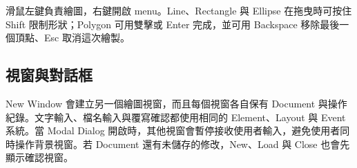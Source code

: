 滑鼠左鍵負責繪圖，右鍵開啟 menu。Line、Rectangle 與 Ellipse 在拖曳時可按住 Shift 限制形狀；Polygon 可用雙擊或 Enter 完成，並可用 Backspace 移除最後一個頂點、Esc 取消這次繪製。

\subsection{視窗與對話框}

New Window 會建立另一個繪圖視窗，而且每個視窗各自保有 Document 與操作紀錄。文字輸入、檔名輸入與覆寫確認都使用相同的 Element、Layout 與 Event 系統。當 Modal Dialog 開啟時，其他視窗會暫停接收使用者輸入，避免使用者同時操作背景視窗。若 Document 還有未儲存的修改，New、Load 與 Close 也會先顯示確認視窗。
